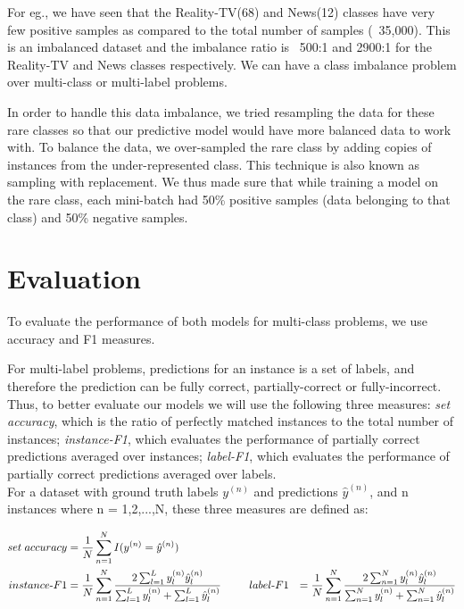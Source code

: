 For eg., we have seen that the Reality-TV(68) and News(12) classes have very few positive samples as compared to the total number of samples (~35,000). This is an imbalanced dataset and the imbalance ratio is ~500:1 and 2900:1 for the Reality-TV and News classes respectively. We can have a class imbalance problem over multi-class or multi-label problems.

In order to handle this data imbalance, we tried resampling the data for these rare classes so that our predictive model would have more balanced data to work with. To balance the data, we over-sampled the rare class by adding copies of instances from the under-represented class. This technique is also known as sampling with replacement. We thus made sure that while training a model on the rare class, each mini-batch had 50\% positive samples (data belonging to that class) and 50\% negative samples.

\section{Evaluation}

To evaluate the performance of both models for multi-class problems, we use accuracy and F1 measures.

For multi-label problems, predictions for an instance is a set of labels, and therefore the prediction can be fully correct, partially-correct or fully-incorrect. Thus, to better evaluate our models we will use the following three measures: \textit{set accuracy}, which is the ratio of perfectly matched instances to the total number of instances; \textit{instance-F1}, which evaluates the performance of partially correct predictions averaged over instances; \textit{label-F1}, which evaluates the performance of partially correct predictions averaged over labels.\\

For a dataset with ground truth labels $y^{(n)}$ and predictions $\hat{y}^{(n)}$, and n instances where n = 1,2,...,N, these three measures are defined as:

\begin{alignat}{2}
\label{eq:eval}
set\; accuracy & = \frac{1}{N} \sum_{n=1}^{N} {I(y^{(n)} = \hat{y}^{(n)})}\\
instance \mbox{-} F1 & = \frac{1}{N} \sum_{n=1}^{N} \frac{2\sum_{l=1}^{L} {y^{(n)}_{l} \hat{y}^{(n)}_{l}}}{\sum_{l=1}^{L} {y^{(n)}_{l}} + \sum_{l=1}^{L} {\hat{y}^{(n)}_{l}}}
\hspace{6ex}
label \mbox{-} F1 & = \frac{1}{N} \sum_{n=1}^{N} \frac{2\sum_{n=1}^{N} {y^{(n)}_{l} \hat{y}^{(n)}_{l}}}{\sum_{n=1}^{N} {y^{(n)}_{l}} + \sum_{n=1}^{N} {\hat{y}^{(n)}_{l}}}
\end{alignat}

